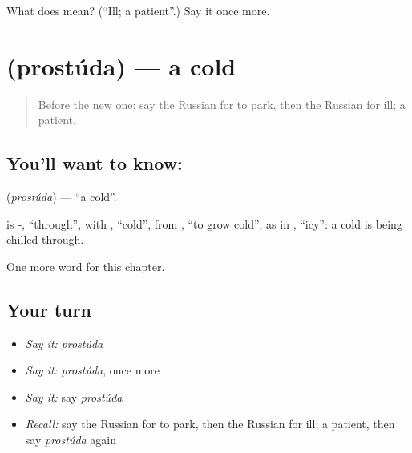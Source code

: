 \begin{tcolorbox}[breakable,colback=teal!4,colframe=teal!35!black,title={Before you move on}]
What does  mean? (\textquotedblleft{}Ill; a patient\textquotedblright{}.) Say it once more.
\end{tcolorbox}
\section[\texorpdfstring{\ru{простуда} (prostúda)}{простуда (prostúda)}]{ (prostúda) — a cold}

\label{lesson:RU-C147-prostuda}



\begin{quote}
Before the new one: say the Russian for to park, then the Russian for ill; a patient.
\end{quote}

\subsection*{You'll want to know: }
\textbf{} (\emph{prostúda}) — \textquotedblleft{}a cold\textquotedblright{}.

\begin{cousinweb}
\textbf{} is \emph{-}, \textquotedblleft{}through\textquotedblright{}, with \emph{}, \textquotedblleft{}cold\textquotedblright{}, from \emph{}, \textquotedblleft{}to grow cold\textquotedblright{}, as in \emph{}, \textquotedblleft{}icy\textquotedblright{}: a cold is being chilled through.
\end{cousinweb}

\begin{grammarlens}[title={What you've built}]
One more word for this chapter.
\end{grammarlens}

\subsection*{Your turn}
\begin{itemize}
\raggedright
  \item \emph{Say it:} \emph{prostúda}
  \item \emph{Say it:} \emph{prostúda}, once more
  \item \emph{Say it:} say \emph{prostúda}
  \item \emph{Recall:} say the Russian for to park, then the Russian for ill; a patient, then say \emph{prostúda} again
\end{itemize}

